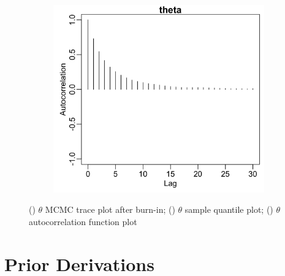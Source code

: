 \documentclass{uwstat572}
\begin{document}
\begin{figure}[H]
\begin{subfigure}[b]{0.49\textwidth}
		\includegraphics[width=\textwidth]{figures/mcmc_acf_plot_theta.png}
		\caption{}
		\label{fig:acf_theta}
	\end{subfigure}
	\caption{() $\theta$ MCMC trace plot after burn-in; () $\theta$ sample quantile plot; () $\theta$ autocorrelation function plot  }
	\label{fig:diagnostics_theta}
\end{figure} 

\newpage
\section{Prior Derivations}
\label{Priors}
\end{document}
